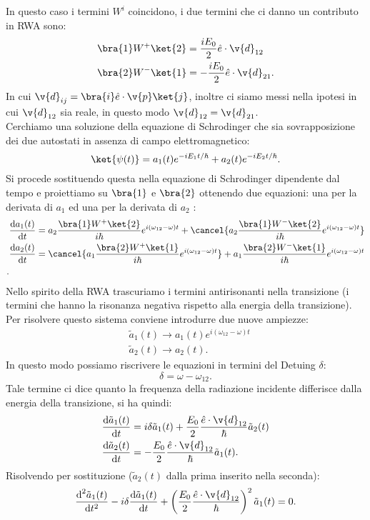 In questo caso i termini $W^i$ coincidono, i due termini che ci danno un contributo in RWA sono:
\[\begin{aligned}
    &\bra{1}W^+\ket{2} = \frac{iE_0}{2}\hat{e}\cdot \v{d}_{12}\\
    &\bra{2}W^-\ket{1} = -\frac{iE_0}{2}\hat{e}\cdot \v{d}_{21}
.\end{aligned}\]
In cui $\v{d}_{ij}=\bra{i}\hat{e}\cdot \v{p}\ket{j}$, inoltre ci siamo messi nella ipotesi in cui $\v{d}_{12}$ sia reale, in questo modo $\v{d}_{12}=\v{d}_{21}$.\\
Cerchiamo una soluzione della equazione di Schrodinger che sia sovrapposizione dei due autostati in assenza di campo elettromagnetico:
\[
    \ket{\psi(t) } = a_1(t) e^{-iE_1t /\hbar } + a_2(t) e^{-iE_2t /\hbar } 
.\] 
Si procede sostituendo questa nella equazione di Schrodinger dipendente dal tempo e proiettiamo su $\bra{1}$ e $\bra{2}$ ottenendo due equazioni: una per la derivata di $a_1$ ed una per la derivata di $a_2$ :
\[\begin{aligned}
    &\frac{\text{d} a_1(t) }{\text{d} t} =
    a_2 \frac{\bra{1}W^+\ket{2}}{i\hbar }e^{i(\omega_{12}-\omega) t}
    +
    \cancel{a_2\frac{\bra{1}W^-\ket{2}}{i\hbar }e^{i(\omega_{12}-\omega) t}}\\
    &\frac{\text{d} a_2(t) }{\text{d} t} =
    \cancel{a_1 \frac{\bra{2}W^+\ket{1}}{i\hbar }e^{i(\omega_{12}-\omega) t}}
    +
    a_1\frac{\bra{2}W^-\ket{1}}{i\hbar }e^{i(\omega_{12}-\omega) t}\\
.\end{aligned}\]
Nello spirito della RWA trascuriamo i termini antirisonanti  nella transizione (i termini che hanno la risonanza negativa rispetto alla energia della transizione).\\
Per risolvere questo sistema conviene introdurre due nuove ampiezze:
\[\begin{aligned}
    &\tilde{a}_1(t) \to a_1(t) e^{i(\omega_{12}-\omega) t}\\
    &\tilde{a}_2(t) \to a_2(t)
.\end{aligned}\]
In questo modo possiamo riscrivere le equazioni in termini del Detuing $\delta$:
\[
\delta  = \omega-\omega_{12}
.\] 
Tale termine ci dice quanto la frequenza della radiazione incidente differisce dalla energia della transizione, si ha quindi:
\[\begin{aligned}
    &\frac{\text{d} \tilde{a}_1(t) }{\text{d} t} = i \delta\tilde{a}_1(t) 
    + \frac{E_0}{2}\frac{\hat{e}\cdot \v{d}_{12}}{\hbar }\tilde{a}_2(t) \\
    &\frac{\text{d} \tilde{a}_2(t)}{\text{d} t} = -\frac{E_0}{2}\frac{\hat{e}\cdot \v{d}_{12}}{\hbar }\tilde{a}_1(t) 
.\end{aligned}\]
Risolvendo per sostituzione ($\tilde{a}_2(t)$ dalla prima inserito nella seconda):
\[
    \frac{\text{d} ^2\tilde{a}_1(t) }{\text{d} t^2} 
    - i\delta\frac{\text{d} \tilde{a}_1(t) }{\text{d} t}
    + \left(\frac{E_0}{2}\frac{\hat{e}\cdot \v{d}_{12}}{\hbar }\right)^2
    \tilde{a}_1(t) = 0
.\] 
